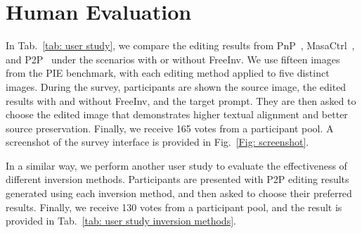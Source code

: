 \documentclass{article}
\begin{document}
\begin{table}[h]
\begin{center}
\caption{Ablation study on plugging FreeInv into SDXL~\cite{podell2024sdxl}.}
\label{tab: plug in sdxl}
\end{center}
\end{table}



\section{Human Evaluation}
\label{user study}
In Tab.~\ref{tab: user study}, we compare the editing results from PnP~\cite{pnpDiffusion2023}, MasaCtrl~\cite{cao2023masactrl}, and P2P~\cite{hertz2022prompt} under the scenarios with or without FreeInv. 
We use fifteen images from the PIE benchmark, with each editing method applied to five distinct images.
During the survey, participants are shown the source image, the edited results with and without FreeInv, and the target prompt. They are then asked to choose the edited image that demonstrates higher textual alignment and better source preservation. Finally, we receive 165 votes from a participant pool.
A screenshot of the survey interface is provided in Fig.~\ref{Fig: screenshot}.

In a similar way, we perform another user study to evaluate the effectiveness of different inversion methods. Participants are presented with P2P editing results generated using each inversion method, and then asked to choose their preferred results. Finally, we receive 130 votes from a participant pool, and the result is provided in Tab.~\ref{tab: user study inversion methods}.



\begin{table}[h]
\begin{center}
\caption{User study on different inversion methods.}
\label{tab: user study inversion methods}
\end{center}
\end{table}
\end{document}
